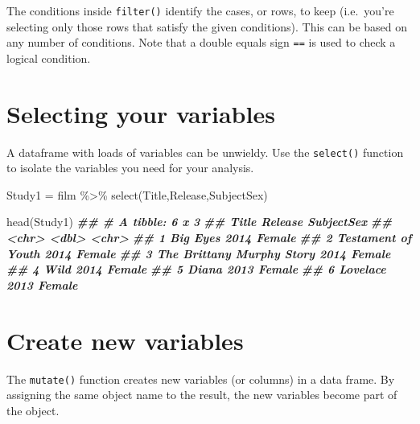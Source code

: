 \documentclass[
  12pt,
]{krantz}
\newenvironment{Shaded}{\begin{snugshade}}{\end{snugshade}}
\newcommand{\DocumentationTok}[1]{\textcolor[rgb]{0.56,0.35,0.01}{\textbf{\textit{#1}}}}
\newcommand{\FunctionTok}[1]{\textcolor[rgb]{0.00,0.00,0.00}{#1}}
\newcommand{\NormalTok}[1]{#1}
\newcommand{\OtherTok}[1]{\textcolor[rgb]{0.56,0.35,0.01}{#1}}
\newcommand{\SpecialCharTok}[1]{\textcolor[rgb]{0.00,0.00,0.00}{#1}}
\begin{document}
The conditions inside \texttt{filter()} identify the cases, or rows, to keep (i.e.~you're selecting only those rows that satisfy the given conditions). This can be based on any number of conditions. Note that a double equals sign \texttt{==} is used to check a logical condition.

\hypertarget{selecting-your-variables}{%
\section{Selecting your variables}\label{selecting-your-variables}}

A dataframe with loads of variables can be unwieldy. Use the \texttt{select()} function to isolate the variables you need for your analysis.

\begin{Shaded}
\begin{Highlighting}[]
\NormalTok{  Study1 }\OtherTok{=}
\NormalTok{    film }\SpecialCharTok{\%\textgreater{}\%}
    \FunctionTok{select}\NormalTok{(Title,Release,SubjectSex)}

  \FunctionTok{head}\NormalTok{(Study1)}
\DocumentationTok{\#\# \# A tibble: 6 x 3}
\DocumentationTok{\#\#   Title                     Release SubjectSex}
\DocumentationTok{\#\#   \textless{}chr\textgreater{}                       \textless{}dbl\textgreater{} \textless{}chr\textgreater{}     }
\DocumentationTok{\#\# 1 Big Eyes                     2014 Female    }
\DocumentationTok{\#\# 2 Testament of Youth           2014 Female    }
\DocumentationTok{\#\# 3 The Brittany Murphy Story    2014 Female    }
\DocumentationTok{\#\# 4 Wild                         2014 Female    }
\DocumentationTok{\#\# 5 Diana                        2013 Female    }
\DocumentationTok{\#\# 6 Lovelace                     2013 Female}
\end{Highlighting}
\end{Shaded}

\hypertarget{create-new-variables}{%
\section{Create new variables}\label{create-new-variables}}

The \texttt{mutate()} function creates new variables (or columns) in a data frame. By assigning the same object name to the result, the new variables become part of the object.
\end{document}
